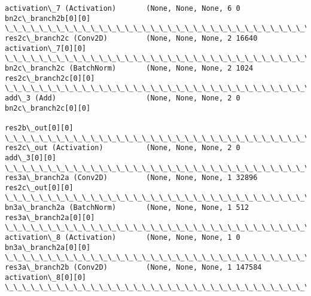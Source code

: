 \documentclass[11pt]{article}
\begin{document}
\begin{Verbatim}[commandchars=\\\{\}]
activation\_7 (Activation)       (None, None, None, 6 0           bn2c\_branch2b[0][0]              
\_\_\_\_\_\_\_\_\_\_\_\_\_\_\_\_\_\_\_\_\_\_\_\_\_\_\_\_\_\_\_\_\_\_\_\_\_\_\_\_\_\_\_\_\_\_\_\_\_\_\_\_\_\_\_\_\_\_\_\_\_\_\_\_\_\_\_\_\_\_\_\_\_\_\_\_\_\_\_\_\_\_\_\_\_\_\_\_\_\_\_\_\_\_\_\_\_\_
res2c\_branch2c (Conv2D)         (None, None, None, 2 16640       activation\_7[0][0]               
\_\_\_\_\_\_\_\_\_\_\_\_\_\_\_\_\_\_\_\_\_\_\_\_\_\_\_\_\_\_\_\_\_\_\_\_\_\_\_\_\_\_\_\_\_\_\_\_\_\_\_\_\_\_\_\_\_\_\_\_\_\_\_\_\_\_\_\_\_\_\_\_\_\_\_\_\_\_\_\_\_\_\_\_\_\_\_\_\_\_\_\_\_\_\_\_\_\_
bn2c\_branch2c (BatchNorm)       (None, None, None, 2 1024        res2c\_branch2c[0][0]             
\_\_\_\_\_\_\_\_\_\_\_\_\_\_\_\_\_\_\_\_\_\_\_\_\_\_\_\_\_\_\_\_\_\_\_\_\_\_\_\_\_\_\_\_\_\_\_\_\_\_\_\_\_\_\_\_\_\_\_\_\_\_\_\_\_\_\_\_\_\_\_\_\_\_\_\_\_\_\_\_\_\_\_\_\_\_\_\_\_\_\_\_\_\_\_\_\_\_
add\_3 (Add)                     (None, None, None, 2 0           bn2c\_branch2c[0][0]              
                                                                 res2b\_out[0][0]                  
\_\_\_\_\_\_\_\_\_\_\_\_\_\_\_\_\_\_\_\_\_\_\_\_\_\_\_\_\_\_\_\_\_\_\_\_\_\_\_\_\_\_\_\_\_\_\_\_\_\_\_\_\_\_\_\_\_\_\_\_\_\_\_\_\_\_\_\_\_\_\_\_\_\_\_\_\_\_\_\_\_\_\_\_\_\_\_\_\_\_\_\_\_\_\_\_\_\_
res2c\_out (Activation)          (None, None, None, 2 0           add\_3[0][0]                      
\_\_\_\_\_\_\_\_\_\_\_\_\_\_\_\_\_\_\_\_\_\_\_\_\_\_\_\_\_\_\_\_\_\_\_\_\_\_\_\_\_\_\_\_\_\_\_\_\_\_\_\_\_\_\_\_\_\_\_\_\_\_\_\_\_\_\_\_\_\_\_\_\_\_\_\_\_\_\_\_\_\_\_\_\_\_\_\_\_\_\_\_\_\_\_\_\_\_
res3a\_branch2a (Conv2D)         (None, None, None, 1 32896       res2c\_out[0][0]                  
\_\_\_\_\_\_\_\_\_\_\_\_\_\_\_\_\_\_\_\_\_\_\_\_\_\_\_\_\_\_\_\_\_\_\_\_\_\_\_\_\_\_\_\_\_\_\_\_\_\_\_\_\_\_\_\_\_\_\_\_\_\_\_\_\_\_\_\_\_\_\_\_\_\_\_\_\_\_\_\_\_\_\_\_\_\_\_\_\_\_\_\_\_\_\_\_\_\_
bn3a\_branch2a (BatchNorm)       (None, None, None, 1 512         res3a\_branch2a[0][0]             
\_\_\_\_\_\_\_\_\_\_\_\_\_\_\_\_\_\_\_\_\_\_\_\_\_\_\_\_\_\_\_\_\_\_\_\_\_\_\_\_\_\_\_\_\_\_\_\_\_\_\_\_\_\_\_\_\_\_\_\_\_\_\_\_\_\_\_\_\_\_\_\_\_\_\_\_\_\_\_\_\_\_\_\_\_\_\_\_\_\_\_\_\_\_\_\_\_\_
activation\_8 (Activation)       (None, None, None, 1 0           bn3a\_branch2a[0][0]              
\_\_\_\_\_\_\_\_\_\_\_\_\_\_\_\_\_\_\_\_\_\_\_\_\_\_\_\_\_\_\_\_\_\_\_\_\_\_\_\_\_\_\_\_\_\_\_\_\_\_\_\_\_\_\_\_\_\_\_\_\_\_\_\_\_\_\_\_\_\_\_\_\_\_\_\_\_\_\_\_\_\_\_\_\_\_\_\_\_\_\_\_\_\_\_\_\_\_
res3a\_branch2b (Conv2D)         (None, None, None, 1 147584      activation\_8[0][0]               
\_\_\_\_\_\_\_\_\_\_\_\_\_\_\_\_\_\_\_\_\_\_\_\_\_\_\_\_\_\_\_\_\_\_\_\_\_\_\_\_\_\_\_\_\_\_\_\_\_\_\_\_\_\_\_\_\_\_\_\_\_\_\_\_\_\_\_\_\_\_\_\_\_\_\_\_\_\_\_\_\_\_\_\_\_\_\_\_\_\_\_\_\_\_\_\_\_\_

\end{Verbatim}
\end{document}

